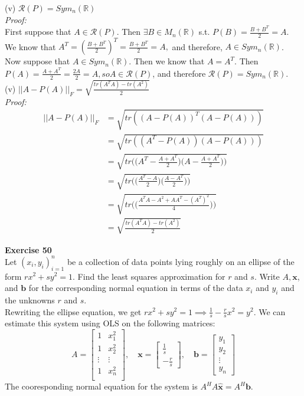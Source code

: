 \documentclass[letterpaper,12pt]{article}
\let\vec\mathbf
\theoremstyle{definition}
\begin{document}
(v) $\mathscr{R}(P) = Sym_n(\mathbb{R})$ \\
\textit{Proof:} \\
First suppose that $A \in \mathscr{R}(P)$. Then $\exists B \in M_n(\mathbb{R})$ s.t. $P(B) = \frac{B + B^T}{2} = A$. We know that $A^T = (\frac{B + B^T}{2})^T = \frac{B + B^T}{2} = A,$ and therefore, $A \in Sym_n(\mathbb{R})$. \\
Now suppose that $A \in Sym_n(\mathbb{R})$. Then we know that $A = A^T$. Then $P(A) = \frac{A + A^T}{2} = \frac{2A}{2} = A, so A \in \mathscr{R}(P)$, and therefore $\mathscr{R}(P) = Sym_n(\mathbb{R})$. \\

(v) $||A - P(A)||_F = \sqrt{\frac{tr(A^TA) - tr(A^2)}{2}}$ \\
\textit{Proof:} \\
\begin{align*}
  ||A - P(A)||_F &= \sqrt{tr((A - P(A))^T(A - P(A)))} \\
  &= \sqrt{tr((A^T - P(A))(A - P(A)))} \\
  &= \sqrt{tr\Big(\Big(A^T - \frac{A + A^T}{2}\Big)\Big(A - \frac{A + A^T}{2}\Big)\Big)} \\
  &= \sqrt{tr\Big(\Big(\frac{A^T - A}{2}\Big)\Big(\frac{A - A^T}{2}\Big)\Big)} \\
  &= \sqrt{tr\Big(\Big(\frac{A^TA - A^2 + AA^T - (A^T)^2}{4}\Big)\Big)} \\
  &= \sqrt{\frac{tr(A^TA) - tr(A^2)}{2}}
\end{align*}

\textbf{Exercise 50} \\
Let $(x_i, y_i)_{i=1}^n$ be a collection of data points lying roughly on an ellipse of the form $rx^2 + sy^2 = 1$. Find the least squares approximation for $r$ and $s$. Write $A, \vec{x}$, and $\vec{b}$ for the corresponding normal equation in terms of the data $x_i$ and $y_i$ and the unknowns $r$ and $s$. \\

Rewriting the ellipse equation, we get $rx^2 + sy^2 = 1 \implies \frac{1}{s} - \frac{r}{s}x^2 = y^2$. We can estimate this system using OLS on the following matrices:
\[ A =
\begin{bmatrix}
  1 & x_1^2 \\
  1 & x_2^2 \\
  \vdots & \vdots \\
  1 & x_n^2 \\
\end{bmatrix}, \quad
\vec{x} =
\begin{bmatrix}
  \frac{1}{s} \\
  -\frac{r}{s}
\end{bmatrix}, \quad
\vec{b} =
\begin{bmatrix}
  y_1 \\
  y_2 \\
  \vdots \\
  y_n
\end{bmatrix}
\]
The cooresponding normal equation for the system is $A^HA \hat{\vec{x}} = A^H \vec{b}$.
\end{document}
